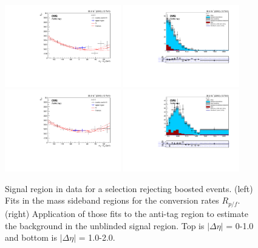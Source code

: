 \begin{figure}[h]
\centering
\includegraphics[width=0.45\textwidth]{F5/HH4b2p1SR_Fit_NRv1_unB1_boost_dEta1.pdf}
\includegraphics[width=0.45\textwidth]{F5/HH4b2p1_Plot_NRv1_unB1_boost_dEta1.pdf}\\
\includegraphics[width=0.45\textwidth]{F5/HH4b2p1SR_Fit_NRv1_unB1_boost_dEta2.pdf}
\includegraphics[width=0.45\textwidth]{F5/HH4b2p1_Plot_NRv1_unB1_boost_dEta2.pdf}
\caption{Signal region in data for a selection rejecting boosted events. (left) Fits in the mass sideband regions for the conversion rates $R_{p/f}$. (right) Application of those fits to the anti-tag region to estimate the background in the unblinded signal region. Top is $|\Delta\eta|$ = 0-1.0 and bottom is $|\Delta\eta|$ = 1.0-2.0.}
\label{fig:databoost}
\end{figure}

